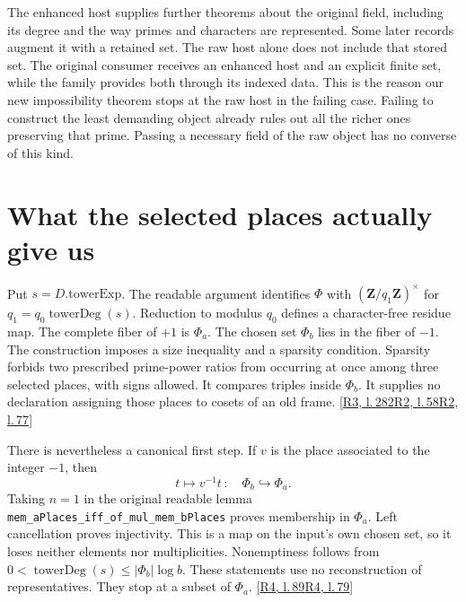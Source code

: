 \documentclass[12pt,letterpaper]{article}
\newcommand{\id}[1]{{\small\nolinkurl{#1}}}
\begin{document}
The enhanced host supplies further theorems about the original field, including its degree and the way primes and characters are represented. Some later records augment it with a retained set. The raw host alone does not include that stored set. The original consumer receives an enhanced host and an explicit finite set, while the family provides both through its indexed data. This is the reason our new impossibility theorem stops at the raw host in the failing case. Failing to construct the least demanding object already rules out all the richer ones preserving that prime. Passing a necessary field of the raw object has no converse of this kind.

\section{What the selected places actually give us}
Put $s=D.\mathrm{towerExp}$. The readable argument identifies $\Phi$ with $(\mathbf Z/q_1\mathbf Z)^\times$ for $q_1=q_0\operatorname{towerDeg}(s)$. Reduction to modulus $q_0$ defines a character-free residue map. The complete fiber of $+1$ is $\Phi_a$. The chosen set $\Phi_b$ lies in the fiber of $-1$. The construction imposes a size inequality and a sparsity condition. Sparsity forbids two prescribed prime-power ratios from occurring at once among three selected places, with signs allowed. It compares triples inside $\Phi_b$. It supplies no declaration assigning those places to cosets of an old frame. {\footnotesize\sffamily\color{mute}[\href{https://github.com/leanprover-community/riemann-hypothesis/blob/e063a923620ee7787b4a1270421478645bf66bdb/src/New/Reduction/Data/FieldsAndPlaces.lean\#L282}{R3, l.\,282}\enspace \href{https://github.com/leanprover-community/riemann-hypothesis/blob/e063a923620ee7787b4a1270421478645bf66bdb/src/New/Reduction/Data/AdmissibleData.lean\#L58}{R2, l.\,58}\enspace \href{https://github.com/leanprover-community/riemann-hypothesis/blob/e063a923620ee7787b4a1270421478645bf66bdb/src/New/Reduction/Data/AdmissibleData.lean\#L77}{R2, l.\,77}]}

There is nevertheless a canonical first step. If $v$ is the place associated to the integer $-1$, then
\[
           t\longmapsto v^{-1}t\, :\quad\Phi_b\hookrightarrow\Phi_a .
\]
Taking $n=1$ in the original readable lemma \id{mem_aPlaces_iff_of_mul_mem_bPlaces} proves membership in $\Phi_a$. Left cancellation proves injectivity. This is a map on the input's own chosen set, so it loses neither elements nor multiplicities. Nonemptiness follows from $0<\operatorname{towerDeg}(s)\leq|\Phi_b|\log b$. These statements use no reconstruction of representatives. They stop at a subset of $\Phi_a$.
 {\footnotesize\sffamily\color{mute}[\href{https://github.com/leanprover-community/riemann-hypothesis/blob/e063a923620ee7787b4a1270421478645bf66bdb/src/New/Reduction/PrimeSums.lean\#L89}{R4, l.\,89}\enspace \href{https://github.com/leanprover-community/riemann-hypothesis/blob/e063a923620ee7787b4a1270421478645bf66bdb/src/New/Reduction/PrimeSums.lean\#L79}{R4, l.\,79}]}
\end{document}
